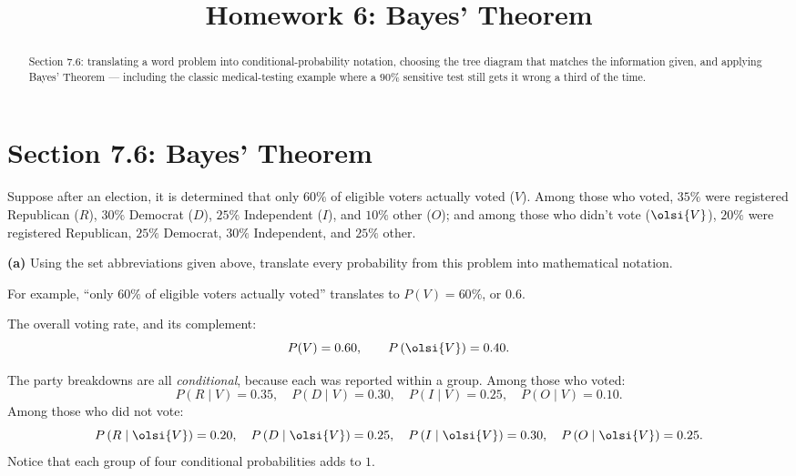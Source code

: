 \documentclass[12pt]{ximera}
\title{Homework 6: Bayes' Theorem}
\begin{document}
\begin{abstract}
Section 7.6: translating a word problem into conditional-probability notation,
choosing the tree diagram that matches the information given, and applying Bayes'
Theorem --- including the classic medical-testing example where a $90\%$ sensitive
test still gets it wrong a third of the time.
\end{abstract}
\maketitle

\section*{Section 7.6: Bayes' Theorem}

\begin{problem}
Suppose after an election, it is determined that only $60\%$ of eligible voters
actually voted ($V$). Among those who voted, $35\%$ were registered Republican
($R$), $30\%$ Democrat ($D$), $25\%$ Independent ($I$), and $10\%$ other ($O$);
and among those who didn't vote ($\olsi{V}$), $20\%$ were registered Republican,
$25\%$ Democrat, $30\%$ Independent, and $25\%$ other.

\begin{prompt}
\textbf{(a)} Using the set abbreviations given above, translate every probability
from this problem into mathematical notation.

For example, ``only $60\%$ of eligible voters actually voted'' translates to
$P(V)=60\%$, or $0.6$.

\begin{freeResponse}
\end{freeResponse}

\begin{feedback}
The overall voting rate, and its complement:
\[ P(V)=0.60, \qquad P\left(\olsi{V}\right)=0.40. \]

The party breakdowns are all \emph{conditional}, because each was reported within a
group. Among those who voted:
\[
P(R\mid V)=0.35,\quad P(D\mid V)=0.30,\quad P(I\mid V)=0.25,\quad P(O\mid V)=0.10.
\]
Among those who did not vote:
\[
P\left(R\mid\olsi{V}\right)=0.20,\quad
P\left(D\mid\olsi{V}\right)=0.25,\quad
P\left(I\mid\olsi{V}\right)=0.30,\quad
P\left(O\mid\olsi{V}\right)=0.25.
\]
Notice that each group of four conditional probabilities adds to $1$.
\end{feedback}
\end{prompt}


\end{problem}
\end{document}
